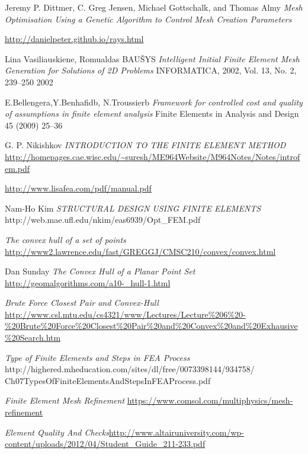 \begin{changemargin}{\CMwidth}{\CMheight}
\begin{thebibliography}{9}
 Jeremy P. Dittmer, C. Greg Jensen, Michael Gottschalk, and Thomas Almy \emph{Mesh Optimisation Using a Genetic Algorithm to Control Mesh Creation Parameters}

 \url{http://danielpeter.github.io/rays.html}

 Lina Vasiliauskiene, Romualdas BAUŠYS \emph{Intelligent Initial Finite Element Mesh Generation for Solutions of 2D Problems} INFORMATICA, 2002, Vol. 13, No. 2, 239–250 2002

 E.Bellengera,Y.Benhafidb, N.Troussierb \emph{Framework for controlled cost and quality of assumptions in finite element analysis} Finite Elements in Analysis and Design 45 (2009) 25--36

 G. P. Nikishkov \emph{INTRODUCTION TO THE FINITE ELEMENT METHOD} \url{http://homepages.cae.wisc.edu/~suresh/ME964Website/M964Notes/Notes/introfem.pdf}

 \url{http://www.lisafea.com/pdf/manual.pdf}

Nam-Ho Kim \emph{STRUCTURAL DESIGN USING FINITE ELEMENTS} http://web.mae.ufl.edu/nkim/eas6939/Opt\_FEM.pdf


 \emph{The convex hull of a set of points} \url{http://www2.lawrence.edu/fast/GREGGJ/CMSC210/convex/convex.html} 

 Dan Sunday \emph{The Convex Hull of a Planar Point Set} \url{http://geomalgorithms.com/a10-_hull-1.html}

 \emph{Brute Force Closest Pair and Convex-Hull} \url{http://www.csl.mtu.edu/cs4321/www/Lectures/Lecture\%206\%20-\%20Brute\%20Force\%20Closest\%20Pair\%20and\%20Convex\%20and\%20Exhausive\%20Search.htm}

\emph{Type of Finite Elements and Steps in FEA Process}\\
http://highered.mheducation.com/sites/dl/free/0073398144/934758/\\Ch07TypesOfFiniteElementsAndStepsInFEAProcess.pdf 

\emph{Finite Element Mesh Refinement} \url{https://www.comsol.com/multiphysics/mesh-refinement}


\emph{Element Quality And Checks}\url{http://www.altairuniversity.com/wp-content/uploads/2012/04/Student_Guide_211-233.pdf}


\end{thebibliography}
\end{changemargin}
